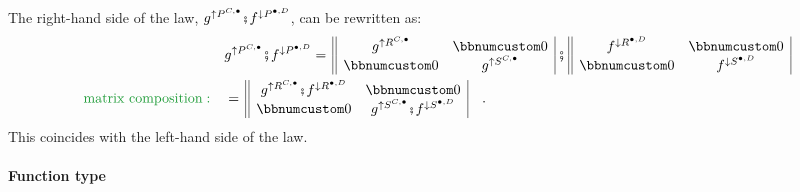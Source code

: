 The right-hand side of the law, $g^{\uparrow P^{C,\bullet}}\bef f^{\downarrow P^{\bullet,D}}$,
can be rewritten as:
\begin{align*}
 & g^{\uparrow P^{C,\bullet}}\bef f^{\downarrow P^{\bullet,D}}=\,\begin{array}{||cc|}
g^{\uparrow R^{C,\bullet}} & \bbnum 0\\
\bbnum 0 & g^{\uparrow S^{C,\bullet}}
\end{array}\,\bef\,\begin{array}{||cc|}
f^{\downarrow R^{\bullet,D}} & \bbnum 0\\
\bbnum 0 & f^{\downarrow S^{\bullet,D}}
\end{array}\\
{\color{greenunder}\text{matrix composition}:}\quad & =\,\begin{array}{||cc|}
g^{\uparrow R^{C,\bullet}}\bef f^{\downarrow R^{\bullet,D}} & \bbnum 0\\
\bbnum 0 & g^{\uparrow S^{C,\bullet}}\bef f^{\downarrow S^{\bullet,D}}
\end{array}\quad.
\end{align*}
This coincides with the left-hand side of the law.

\paragraph{Function type}

